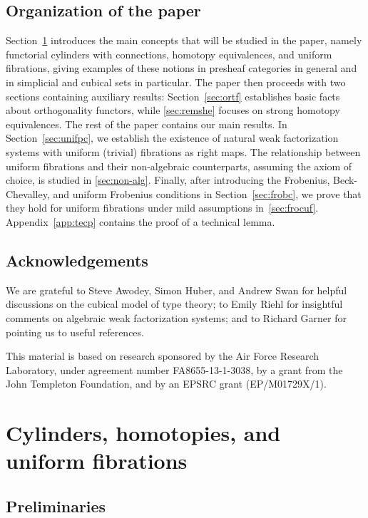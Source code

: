 \documentclass[reqno,10pt,a4paper,oneside,draft]{amsart}
\begin{document}
\subsection*{Organization of the paper}
Section~\ref{sec:cylhuf} introduces the main concepts that will be studied in the paper, namely functorial cylinders with connections, homotopy equivalences, and uniform fibrations, giving examples of these notions in presheaf categories in general and in simplicial and cubical sets in particular.
The paper then proceeds with two sections containing auxiliary results: Section~\ref{sec:ortf} establishes basic facts about orthogonality functors, while \cref{sec:remshe} focuses on strong homotopy equivalences.
The rest of the paper contains our main results.
In Section~\ref{sec:unifpc}, we establish the existence of natural weak factorization systems with uniform (trivial) fibrations as right maps.
The relationship between uniform fibrations and their non-algebraic counterparts, assuming the axiom of choice, is studied in \cref{sec:non-alg}.
Finally, after introducing the Frobenius, Beck-Chevalley, and uniform Frobenius conditions in Section~\ref{sec:frobc}, we prove that they hold for uniform fibrations under mild assumptions in~\cref{sec:frocuf}.
Appendix~\ref{app:tecp} contains the proof of a technical lemma.

\subsection*{Acknowledgements}
We are grateful to Steve Awodey, Simon Huber, and Andrew Swan for helpful discussions on the cubical model of type theory; to Emily Riehl for insightful comments on algebraic weak factorization systems; and to Richard Garner for pointing us to useful references.

This material is based on research sponsored by the Air Force Research Laboratory, under agreement number FA8655-13-1-3038, by a grant from the John Templeton Foundation, and by an EPSRC grant (EP/M01729X/1).


\section{Cylinders, homotopies, and uniform fibrations}
\label{sec:cylhuf}

\subsection*{Preliminaries}
\end{document}
